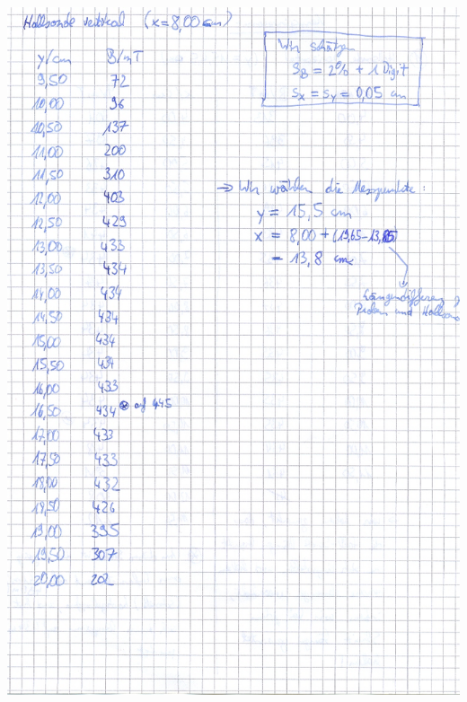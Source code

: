 \begin{appendix}
\centering \includegraphics[width = \textwidth]{appendix/scan0002.jpg}

\end{appendix}
